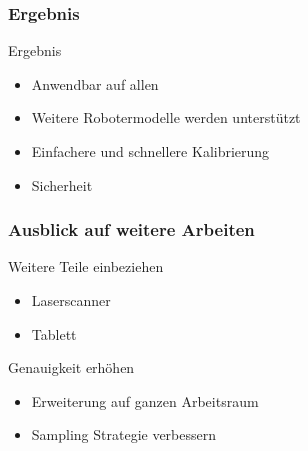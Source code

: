 
\begin{frame}
  \frametitle{Ergebnis}
  \begin{block}{Ergebnis}
    \begin{itemize}[<+->]
      \item Anwendbar auf allen \cob
      \item Weitere Robotermodelle werden unterstützt
      \item Einfachere und schnellere Kalibrierung
      \item Sicherheit 
    \end{itemize}
  \end{block}
\end{frame}


\begin{frame}
  \frametitle{Ausblick auf weitere Arbeiten}
  \begin{block} {Weitere Teile einbeziehen}
    \pause
    \begin{itemize}
      \item Laserscanner \pause
      \item Tablett \pause
    \end{itemize}
  \end{block}

  \begin{block} {Genauigkeit erhöhen}
    \pause
    \begin{itemize}
      \item Erweiterung auf ganzen Arbeitsraum \pause
      \item Sampling Strategie verbessern
    \end{itemize}
  \end{block}
\end{frame}

  \bgroup


